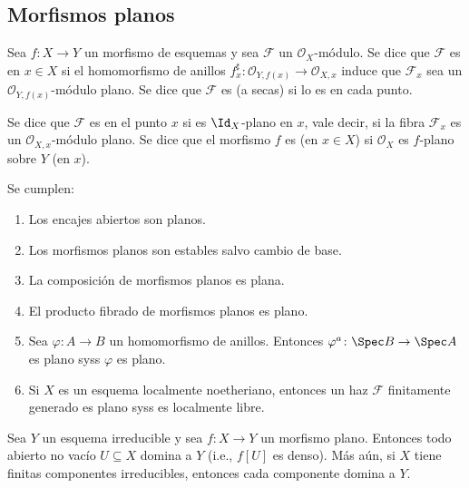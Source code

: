 \subsection{Morfismos planos}
\begin{mydef}
	Sea $f\colon X \to Y$ un morfismo de esquemas y sea $\mathscr{F}$ un $\mathscr{O}_X$-módulo.
	Se dice que $\mathscr{F}$ es  en $x \in X$ si el homomorfismo de anillos
	$f_x^\sharp\colon \mathscr{O}_{Y, f(x)} \to \mathscr{O}_{X, x}$ induce que $\mathscr{F}_{x}$ sea un $\mathscr{O}_{Y, f(x)}$-módulo plano.
	Se dice que $\mathscr{F}$ es  (a secas) si lo es en cada punto.

	Se dice que $\mathscr{F}$ es  en el punto $x$ si es $\Id_X$-plano en $x$,
	vale decir, si la fibra $\mathscr{F}_x$ es un $\mathscr{O}_{X, x}$-módulo plano.
	Se dice que el morfismo $f$ es  (en $x \in X$) si $\mathscr{O}_X$ es $f$-plano sobre $Y$ (en $x$).
\end{mydef}

\begin{prop}
	Se cumplen:
	\begin{enumerate}
		\item Los encajes abiertos son planos.
		\item Los morfismos planos son estables salvo cambio de base.
		\item La composición de morfismos planos es plana.
		\item El producto fibrado de morfismos planos es plano.
		\item Sea $\varphi\colon A \to B$ un homomorfismo de anillos.
			Entonces $\varphi^a\colon \Spec B \to \Spec A$ es plano syss $\varphi$ es plano.
		\item Si $X$ es un esquema localmente noetheriano, entonces un haz $\mathscr{F}$ finitamente generado es plano syss es localmente libre.
	\end{enumerate}
\end{prop}

\begin{lem}\label{thm:flat_are_very_dominant}
	Sea $Y$ un esquema irreducible y sea $f\colon X \to Y$ un morfismo plano.
	Entonces todo abierto no vacío $U \subseteq X$ domina a $Y$ (i.e., $f[U]$ es denso).
	Más aún, si $X$ tiene finitas componentes irreducibles, entonces cada componente domina a $Y$.
\end{lem}

